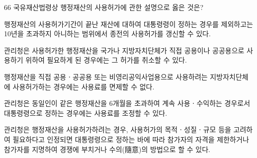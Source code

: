 \begin{question}{66}
국유재산법령상 행정재산의 사용허가에 관한 설명으로 옳은 것은?
\begin{choices}
  \item 행정재산의 사용허가기간이 끝난 재산에 대하여 대통령령이 정하는 경우를 제외하고는 10년을 초과하지 아니하는 범위에서 종전의 사용허가를 갱신할 수 있다.
  \item 관리청은 사용허가한 행정재산을 국가나 지방자치단체가 직접 공용이나 공공용으로 사용하기 위하여 필요하게 된 경우에는 그 허가를 취소할 수 있다.
  \item 행정재산을 직접 공용ㆍ공공용 또는 비영리공익사업용으로 사용하려는 지방자치단체에 사용허가하는 경우에는 사용료를 면제할 수 없다.
  \item 관리청은 동일인이 같은 행정재산을 6개월을 초과하여 계속 사용ㆍ수익하는 경우로서 대통령령으로 정하는 경우에는 사용료를 조정할 수 있다.
  \item 관리청은 행정재산을 사용허가하려는 경우, 사용허가의 목적ㆍ성질ㆍ규모 등을 고려하여 필요하다고 인정되면 대통령령으로 정하는 바에 따라 참가자의 자격을 제한하거나 참가자를 지명하여 경쟁에 부치거나 수의(隨意)의 방법으로 할 수 있다.
\end{choices}
\end{question}

